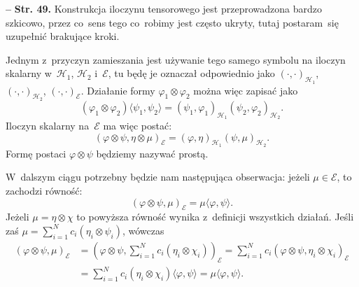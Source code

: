 \documentclass[a4paper,11pt]{article}
\newcommand{\mc}{\mathcal}
\newcommand{\vp}{\varphi}
\newcommand{\Hc}{\mc{H}}
\newcommand{\ot}{\otimes}
\newcommand{\Sum}{\sum\limits}
\newcommand{\lket}{\langle}
\newcommand{\rket}{\rangle}
\newcommand{\tb}{\textbf}
\newcommand{\noi}{\noindent}
\newcommand{\start}{\noi \tb{--} {}}
\newcommand{\Str}[1]{\tb{Str. #1.}}
\begin{document}
\start \Str{49} Konstrukcja iloczynu tensorowego jest przeprowadzona
bardzo szkicowo, przez co~sens tego co~robimy jest często ukryty,
tutaj postaram~się uzupełnić brakujące kroki.

Jednym z~przyczyn zamieszania jest używanie tego samego symbolu na
iloczyn skalarny w~$\Hc_{ 1 }$, $\Hc_{ 2 }$ i~$\mc{E}$, tu będę je
oznaczał odpowiednio jako $( \cdot, \cdot )_{ \Hc_{ 1 } }$,
$( \cdot, \cdot )_{ \Hc_{ 2 } }$, $( \cdot, \cdot )_{ \mc{ E } }$.
Działanie formy $\vp_{ 1 } \ot \vp_{ 2 }$ można więc zapisać jako
\begin{displaymath}
  ( \vp_{ 1 } \ot \vp_{ 2 } )\lket \psi_{ 1 }, \psi_{ 2 } \rket
  = ( \psi_{ 1 }, \vp_{ 1 } )_{ \Hc_{ 1 } } ( \psi_{ 2 },
  \vp_{ 2 } )_{ \Hc_{ 2 } }.
\end{displaymath}
Iloczyn skalarny na~$\mc{E}$ ma więc postać:
\begin{displaymath}
  ( \vp \ot \psi, \eta \ot \mu )_{ \mc{E} } = ( \vp, \eta )_{ \Hc_{ 1 } }
  ( \psi, \mu )_{ \Hc_{ 2 } }.
\end{displaymath}
Formę postaci $\vp \ot \psi$ będziemy nazywać prostą.

W~dalszym ciągu potrzebny %
będzie nam następująca obserwacja: jeżeli $\mu \in \mc{E}$, to
zachodzi równość:
\begin{displaymath}
  ( \vp \ot \psi, \mu )_{ \mc{E} } = \mu\lket \vp, \psi \rket.
\end{displaymath}
Jeżeli $\mu = \eta \ot \chi$ to powyższa równość wynika z~definicji
wszystkich działań. Jeśli zaś
$\mu = \Sum_{ i = 1 }^{ N } c_{ i } ( \eta_{ i } \ot \psi_{ i } )$,
wówczas
\begin{displaymath}
  \begin{split}
    ( \vp \ot \psi, \mu )_{ \mc{E} } &= \left( \vp \ot \psi, \Sum_{ i
        = 1 }^{ N } c_{ i } ( \eta_{ i } \ot \chi_{ i } ) \right)_{
      \mc{E} } = \Sum_{ i = 1 }^{ N } c_{ i } ( \vp \ot \psi,
    \eta_{ i } \ot \chi_{ i } )_{ \mc{E} } \\
    &= \Sum_{ i = 1 }^{ N } c_{ i } ( \eta_{ i } \ot \chi_{ i } )
    \lket \vp, \psi \rket = \mu\lket \vp, \psi \rket.
  \end{split}
\end{displaymath}
\end{document}
